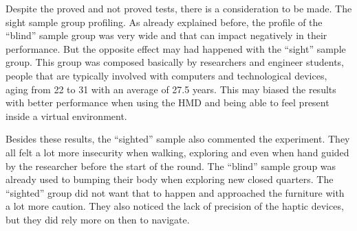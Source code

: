 Despite the proved and not proved tests, there is a consideration to be made. The sight sample group profiling. As already explained before, the profile of the “blind” sample group was very wide and that can impact negatively in their performance. But the opposite effect may had happened with the “sight” sample group. This group was composed basically by researchers and engineer students, people that are typically involved with computers and technological devices, aging from 22 to 31 with an average of 27.5 years. This may biased the results with better performance when using the HMD and being able to feel present inside a virtual environment.

Besides these results, the “sighted” sample also commented the experiment. They all felt a lot more insecurity when walking, exploring and even when hand guided by the researcher before the start of the round. The “blind” sample group was already used to bumping their body when exploring new closed quarters. The “sighted” group did not want that to happen and approached the furniture with a lot more caution. They also noticed the lack of precision of the haptic devices, but they did rely more on then to navigate.

